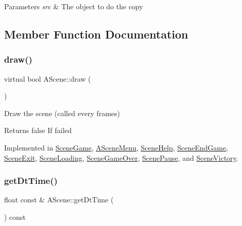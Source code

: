 \begin{DoxyParams}{Parameters}
{\em src} & The object to do the copy \\
\hline
\end{DoxyParams}


\subsection{Member Function Documentation}
\mbox{\label{class_a_scene_a7c303489d4c296482af38aa5deccbd8b}} 
\subsubsection{\texorpdfstring{draw()}{draw()}}
{\footnotesize\ttfamily virtual bool A\+Scene\+::draw (\begin{DoxyParamCaption}{ }\end{DoxyParamCaption})\hspace{0.3cm}{\ttfamily [pure virtual]}}



Draw the scene (called every frames) 

\begin{DoxyReturn}{Returns}
false If failed 
\end{DoxyReturn}


Implemented in \hyperlink{class_scene_game_a0797fee2de442f68aef19cc5c3299ec3}{Scene\+Game}, \hyperlink{class_a_scene_menu_a5c11f34c83f025e1181219bf25ce4694}{A\+Scene\+Menu}, \hyperlink{class_scene_help_a8f6cc7a52fe41d06815ff10a9ac941a2}{Scene\+Help}, \hyperlink{class_scene_end_game_a145614d80f41512a5bcf539278555d0c}{Scene\+End\+Game}, \hyperlink{class_scene_exit_a3b7110e736f86836568fdb2f8a997877}{Scene\+Exit}, \hyperlink{class_scene_loading_ae51a1b4d4f738847d50036c174364f9e}{Scene\+Loading}, \hyperlink{class_scene_game_over_aa9c4f9d3cabdc89176c0113e2864f3e8}{Scene\+Game\+Over}, \hyperlink{class_scene_pause_aa59d21ea311bab5163574441f3960734}{Scene\+Pause}, and \hyperlink{class_scene_victory_ac79e3eadfb4bfafa8733888a1e86f57e}{Scene\+Victory}.

\mbox{\label{class_a_scene_aad3e0d8810515e904fc315a12a344bc3}} 
\subsubsection{\texorpdfstring{get\+Dt\+Time()}{getDtTime()}}
{\footnotesize\ttfamily float const  \& A\+Scene\+::get\+Dt\+Time (\begin{DoxyParamCaption}{ }\end{DoxyParamCaption}) const}




